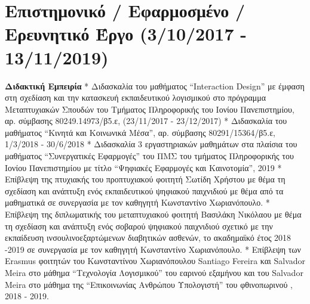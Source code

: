\documentclass[%
    11pt,
  oneside
  ]{memoir}
\let\oldsection\section
\renewcommand{\section}[1]{%
  \oldsection{#1}
  \leavevmode
  \par
  \vspace{\dimexpr-\baselineskip-\parskip}
}
\begin{document}
\hypertarget{ux3b5ux3c0ux3b9ux3c3ux3c4ux3b7ux3bcux3bfux3bdux3b9ux3baux3cc-ux3b5ux3c6ux3b1ux3c1ux3bcux3bfux3c3ux3bcux3adux3bdux3bf-ux3b5ux3c1ux3b5ux3c5ux3bdux3b7ux3c4ux3b9ux3baux3cc-ux3adux3c1ux3b3ux3bf-3102017---13112019}{%
\section{Επιστημονικό / Εφαρμοσμένο / Ερευνητικό Έργο (3/10/2017 -
13/11/2019)}\label{ux3b5ux3c0ux3b9ux3c3ux3c4ux3b7ux3bcux3bfux3bdux3b9ux3baux3cc-ux3b5ux3c6ux3b1ux3c1ux3bcux3bfux3c3ux3bcux3adux3bdux3bf-ux3b5ux3c1ux3b5ux3c5ux3bdux3b7ux3c4ux3b9ux3baux3cc-ux3adux3c1ux3b3ux3bf-3102017---13112019}}

\textbf{Διδακτική Εμπειρία} * Διδασκαλία του μαθήματος ``Interaction
Design'' με έμφαση στη σχεδίαση και την κατασκευή εκπαιδευτικού
λογισμικού στο πρόγραμμα Μεταπτυχιακών Σπουδών του Τμήματος Πληροφορικής
του Ιονίου Πανεπιστημίου, αρ. σύμβασης 80249.14973/β5.ε, (23/11/2017 -
23/12/2017) * Διδασκαλία του μαθήματος ``Κινητά και Κοινωνικά Μέσα'',
αρ. σύμβασης 80291/15364/β5.ε, 1/3/2018 - 30/6/2018 * Διδασκαλία 3
εργαστηριακών μαθημάτων στα πλαίσια του μαθήματος ``Συνεργατικές
Εφαρμογές'' του ΠΜΣ του τμήματος Πληροφορικής του Ιονίου Πανεπιστημίου
με τίτλο ``Ψηφιακές Εφαρμογές και Καινοτομία'', 2019 * Επίβλεψη της
πτυχιακής του προπτυχιακού φοιτητή Σωτίδη Χρήστου με θέμα τη σχεδίαση
και ανάπτυξη ενός εκπαιδευτικού ψηφιακού παιχνιδιού με θέμα από τα
μαθηματικά σε συνεργασία με τον καθηγητή Κωνσταντίνο Χωριανόπουλο. *
Επίβλεψη της διπλωματικής του μεταπτυχιακού φοιτητή Βασιλάκη Νικόλαου με
θέμα τη σχεδίαση και ανάπτυξη ενός σοβαρού ψηφιακού παιχνιδιού σχετικό
με την εκπαίδευση ινσουλινοεξαρτώμενων διαβητικών ασθενών, το ακαδημαϊκό
έτος 2018 -2019 σε συνεργασία με τον καθηγητή Κωνσταντίνο Χωριανόπουλο.
* Επίβλεψη των Erasmus φοιτητών του Κωνσταντίνου Χωριανόπουλου Santiago
Fereira και Salvador Meira στο μάθημα ``Τεχνολογία Λογισμικού'' του
εαρινού εξαμήνου και του Salvador Meira στο μάθημα της ``Επικοινωνίας
Ανθρώπου Υπολογιστή'' του φθινοπωρινού , 2018 - 2019.
\end{document}
